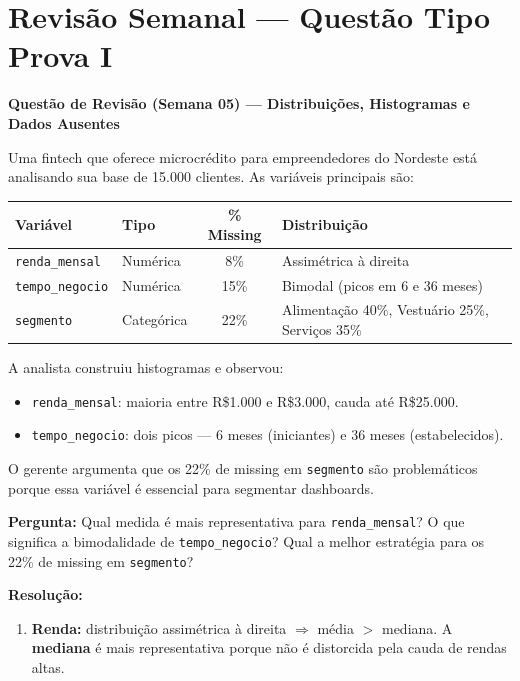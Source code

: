 \section{Revisão Semanal — Questão Tipo Prova I}

\begin{SolvedBox}
\textbf{Questão de Revisão (Semana 05) — Distribuições, Histogramas e Dados Ausentes}

Uma fintech que oferece microcrédito para empreendedores do Nordeste está
analisando sua base de 15.000 clientes. As variáveis principais são:

\begin{center}
\begin{tabular}{|l|l|c|l|}
\hline
\textbf{Variável} & \textbf{Tipo} & \textbf{\% Missing} & \textbf{Distribuição} \\
\hline
\texttt{renda\_mensal}       & Numérica    & 8\%  & Assimétrica à direita \\
\texttt{tempo\_negocio}      & Numérica    & 15\% & Bimodal (picos em 6 e 36 meses) \\
\texttt{segmento}            & Categórica  & 22\% & Alimentação 40\%, Vestuário 25\%, Serviços 35\% \\
\hline
\end{tabular}
\end{center}

A analista construiu histogramas e observou:
\begin{itemize}
  \item \texttt{renda\_mensal}: maioria entre R\$1.000 e R\$3.000, cauda até R\$25.000.
  \item \texttt{tempo\_negocio}: dois picos — 6 meses (iniciantes) e 36 meses (estabelecidos).
\end{itemize}

O gerente argumenta que os 22\% de missing em \texttt{segmento} são problemáticos
porque essa variável é essencial para segmentar dashboards.

\textbf{Pergunta:} Qual medida é mais representativa para \texttt{renda\_mensal}?
O que significa a bimodalidade de \texttt{tempo\_negocio}? Qual a melhor
estratégia para os 22\% de missing em \texttt{segmento}?

\medskip
\textbf{Resolução:}

\begin{enumerate}
  \item \textbf{Renda:} distribuição assimétrica à direita $\Rightarrow$ média $>$ mediana.
  A \textbf{mediana} é mais representativa porque não é distorcida pela cauda de rendas altas.


\end{enumerate}
\end{SolvedBox}
